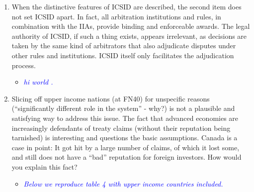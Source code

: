 \begin{enumerate}
	\item When the distinctive features of ICSID are described, the second item does not set ICSID apart. In fact, all arbitration institutions and rules, in combination with the IIAs, provide binding and enforceable awards. The legal authority of ICSID, if such a thing exists, appears irrelevant, as decisions are taken by the same kind of arbitrators that also adjudicate disputes under other rules and institutions. ICSID itself only facilitates the adjudication process. 
	\begin{itemize}
		\item \textcolor{blue}{ \emph{ hi world . }}
	\end{itemize}
	\clearpage
	\item Slicing off upper income nations (at FN40) for unspecific reasons (``significantly different role in the system'' - why?) is not a plausible and satisfying way to address this issue. The fact that advanced economies are increasingly defendants of treaty claims (without their reputation being tarnished) is interesting and questions the basic assumptions. Canada is a case in point: It got hit by a large number of claims, of which it lost some, and still does not have a ``bad'' reputation for foreign investors. How would you explain this fact?	
	\begin{itemize}
		\item \textcolor{blue}{ \emph{ Below we reproduce table 4 with upper income countries included. }}


\end{itemize}
\end{enumerate}
